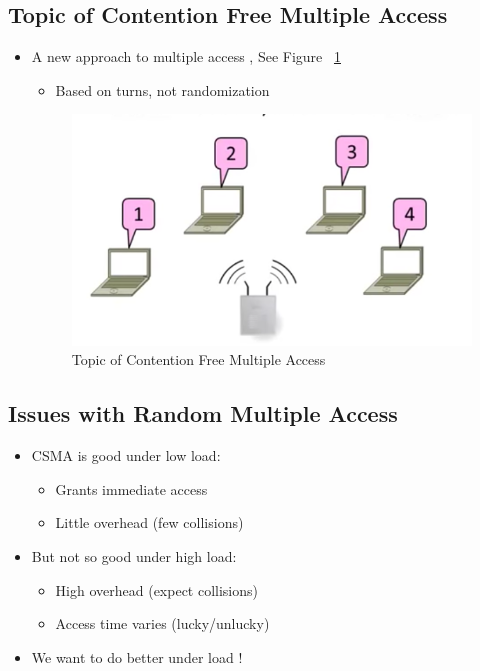 \documentclass[12pt]{ctexart}   %
\begin{document}
	\subsection{Topic of Contention Free Multiple Access}
	\begin{itemize}
		\item A new approach to multiple access  , See Figure~ \ref{fig:3-5-1}
		\begin{itemize}
			\item Based on turns, not randomization
		\end{itemize}
		
		\begin{figure}[h!] %
		\centering
		 \includegraphics[scale=0.7]{images/3-5-1}
		\caption{ Topic of Contention Free Multiple Access }
		 \label{fig:3-5-1}
		 \end{figure}
	\end{itemize}
	
	\subsection{Issues with Random Multiple Access}
	\begin{itemize}
		\item CSMA is good under low load:
		\begin{itemize}
			\item Grants immediate access
			\item Little overhead (few collisions)
		\end{itemize}
		
		\item But not so good under high load:
		\begin{itemize}
			\item High overhead (expect collisions)
			\item Access time varies (lucky/unlucky)
		\end{itemize}
		
		\item We want to do better under load !
	\end{itemize}
	
\end{document}
